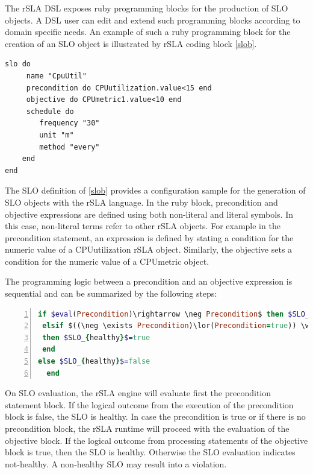 The rSLA DSL exposes ruby programming blocks for the production of SLO objects. A DSL user can edit and extend such programming blocks according to domain specific needs. An example of such a ruby programming block for the creation of an SLO object is illustrated by rSLA coding block \ref{slob}.
\begin{lstlisting}[caption=SLO definition, label=slob]
slo do
     name "CpuUtil"
     precondition do CPUutilization.value<15 end
     objective do CPUmetric1.value<10 end
     schedule do
      	frequency "30"
    	unit "m"
    	method "every"
    end
end	
\end{lstlisting}

The SLO definition of \ref{slob} provides a configuration sample for the generation of SLO objects with the rSLA language. In the ruby block, precondition and objective expressions are defined using both non-literal and literal symbols. In this case, non-literal terms refer to other rSLA objects. For example in the precondition statement, an expression is defined by stating a condition for the numeric value of a CPUutilization rSLA object. Similarly, the objective sets a condition for the numeric value of a CPUmetric object.

The programming logic between a precondition and an objective expression is sequential and can be summarized by the following steps:

\begin{lstlisting}[language=Ruby, basicstyle=\small\normalfont\sffamily, breaklines=true,  captionpos=b, mathescape=true, caption=rSLA SLO precondition-objective logic, label=ifelse, numbers=left, numbersep=5pt, numberstyle=\tiny]
if $eval(Precondition)\rightarrow \neg Precondition$ then $SLO_{healthy}$ = true
 elsif $((\neg \exists Precondition)\lor(Precondition=true)) \wedge eval(Objective) \rightarrow$ true
 then $SLO_{healthy}$=true 
 end
else $SLO_{healthy}$=false
  end
\end{lstlisting}

On SLO evaluation, the rSLA engine will evaluate first the precondition statement block. If the logical outcome from the execution of the precondition block is false, the SLO is healthy. In case the precondition is true or if there is no precondition block, the rSLA runtime will proceed with the evaluation of the objective block. If the logical outcome from processing statements of the objective block is true, then the SLO is healthy. Otherwise the SLO evaluation indicates not-healthy. A non-healthy SLO may result into a violation.